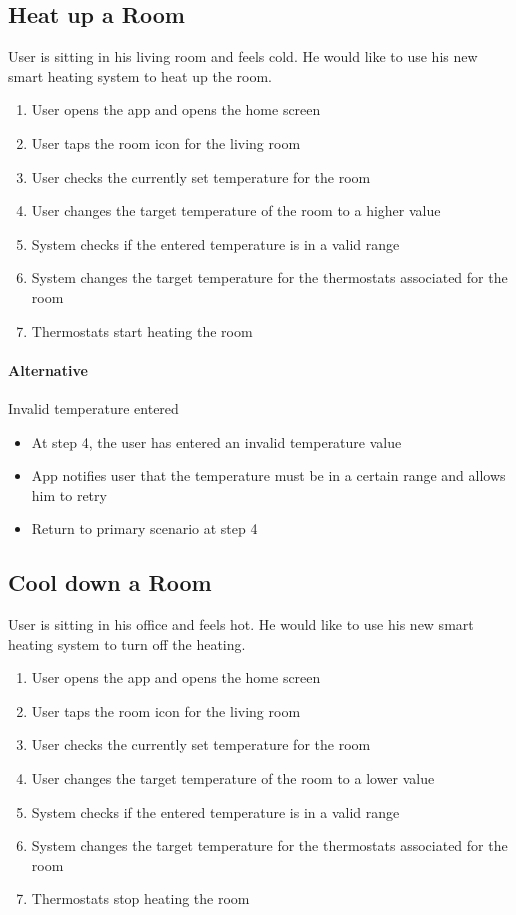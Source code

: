 \subsection{Heat up a Room}
User is sitting in his living room and feels cold. He would like to use his new smart heating system to heat up the room.
\begin{enumerate}
    \item User opens the app and opens the home screen
    \item User taps the room icon for the living room
    \item User checks the currently set temperature for the room
    \item User changes the target temperature of the room to a higher value
    \item System checks if the entered temperature is in a valid range
    \item System changes the target temperature for the thermostats associated for the room
    \item Thermostats start heating the room
\end{enumerate}

\paragraph{Alternative} Invalid temperature entered
\begin{itemize}
    \item At step 4, the user has entered an invalid temperature value
    \item App notifies user that the temperature must be in a certain range and allows him to retry
    \item Return to primary scenario at step 4
\end{itemize}


\subsection{Cool down a Room}
User is sitting in his office and feels hot. He would like to use his new smart heating system to turn off the heating.
\begin{enumerate}
    \item User opens the app and opens the home screen
    \item User taps the room icon for the living room
    \item User checks the currently set temperature for the room
    \item User changes the target temperature of the room to a lower value
    \item System checks if the entered temperature is in a valid range
    \item System changes the target temperature for the thermostats associated for the room
    \item Thermostats stop heating the room
\end{enumerate}

